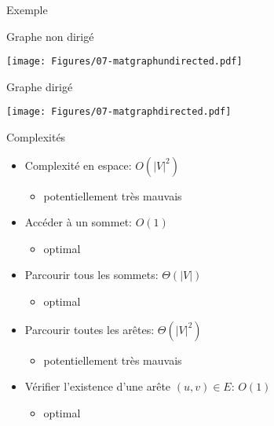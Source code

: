 \begin{frame}{Exemple}

Graphe non dirigé
\centerline{\texttt{[image: Figures/07-matgraphundirected.pdf]}}

\bigskip

Graphe dirigé
\centerline{\texttt{[image: Figures/07-matgraphdirected.pdf]}}

\end{frame}

\begin{frame}{Complexités}
\begin{itemize}
\item Complexité en espace: $O(|V|^2)$
\begin{itemize}
\item potentiellement très mauvais
\end{itemize}
\item Accéder à un sommet: $O(1)$
\begin{itemize}
\item optimal
\end{itemize}
\item Parcourir tous les sommets: $\Theta(|V|)$
\begin{itemize}
\item optimal
\end{itemize}
\item Parcourir toutes les arêtes: $\Theta(|V|^2)$
\begin{itemize}
\item potentiellement très mauvais
\end{itemize}
\item Vérifier l'existence d'une arête $(u,v)\in E$: $O(1)$
\begin{itemize}
\item optimal
\end{itemize}
\end{itemize}
\end{frame}


